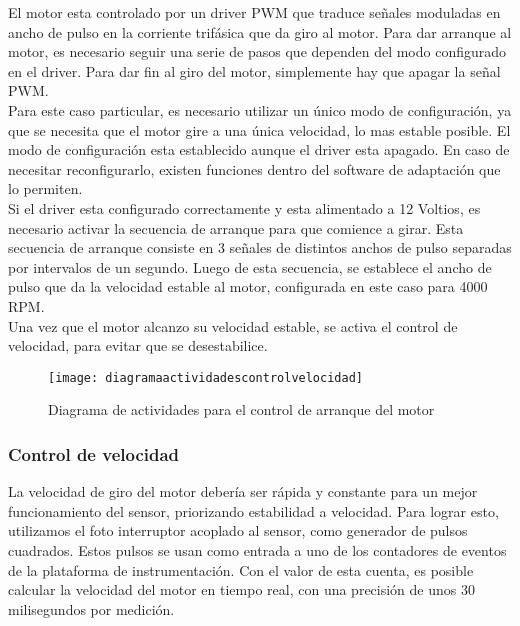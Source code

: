 El motor esta controlado por un driver PWM que traduce señales moduladas en ancho de pulso en la corriente trifásica que da giro al motor. Para dar arranque al motor, es necesario seguir una serie de pasos que dependen del modo configurado en el driver. Para dar fin al giro del motor, simplemente hay que apagar la señal PWM. \\

Para este caso particular, es necesario utilizar un único modo de configuración, ya que se necesita que el motor gire a una única velocidad, lo mas estable posible. El modo de configuración esta establecido aunque el driver esta apagado. En caso de necesitar reconfigurarlo, existen funciones dentro del software de adaptación que lo permiten. \\

Si el driver esta configurado correctamente y esta alimentado a 12 Voltios, es necesario activar la secuencia de arranque para que comience a girar. Esta secuencia de arranque consiste en 3 señales de distintos anchos de pulso separadas por intervalos de un segundo. Luego de esta secuencia, se establece el ancho de pulso que da la velocidad estable al motor, configurada en este caso para 4000 RPM. \\

Una vez que el motor alcanzo su velocidad estable, se activa el control de velocidad, para evitar que se desestabilice. 

\begin{figure}[h]
  \centering
  \texttt{[image: diagramaactividadescontrolvelocidad]}
  \caption{Diagrama de actividades para el control de arranque del motor}\label{fig:diagramaactividadesarrancarmotor}
\end{figure}


\subsubsection{Control de velocidad} %
\label{it6:ssub:control_de_velocidad}

La velocidad de giro del motor debería ser rápida y constante para un mejor funcionamiento del sensor, priorizando estabilidad a velocidad. Para lograr esto, utilizamos el foto interruptor acoplado al sensor, como generador de pulsos cuadrados. Estos pulsos se usan como entrada a uno de los contadores de eventos de la plataforma de instrumentación. Con el valor de esta cuenta, es posible calcular la velocidad del motor en tiempo real, con una precisión de unos 30 milisegundos por medición. \\

